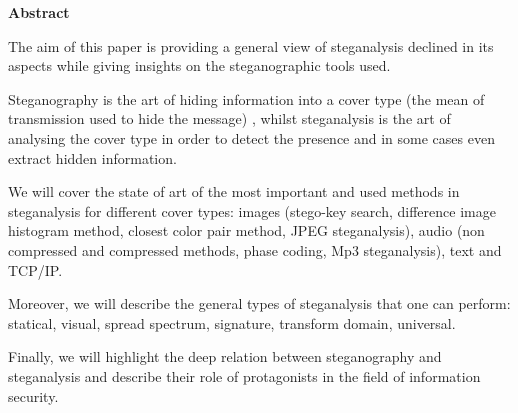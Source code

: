 \documentclass[../../main.tex]{subfiles}
\begin{document}
\begin{center}
    \center \textbf{Abstract}
\end{center}

\vspace{0.1cm}

The aim of this paper is providing a general view of steganalysis declined in its aspects
while giving insights on the steganographic tools used. 

Steganography is the art of hiding information into a cover type (the mean of
transmission used to hide the message) \cite{steganography-definition}, whilst
steganalysis is the art of analysing the cover type in order to detect the presence and in some cases even extract hidden information.

We will cover the state of art of the most important and used methods in
steganalysis for different cover types: images (stego-key search, difference
image histogram method, closest color pair method, JPEG steganalysis), audio
(non compressed and compressed methods, phase coding, Mp3 steganalysis), text
and TCP/IP.

Moreover, we will describe the general types of steganalysis that one can
perform: statical, visual, spread spectrum, signature, transform domain,
universal.

Finally, we will highlight the deep relation between steganography and steganalysis and describe their 
role of protagonists in the field of information security.
\end{document}
